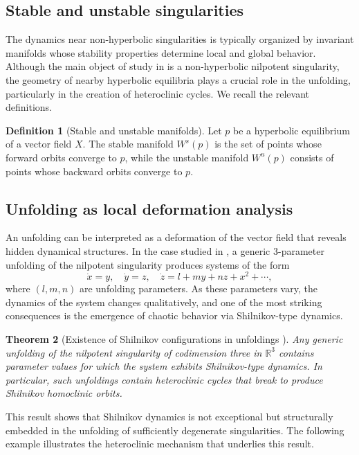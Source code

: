 \documentclass[12pt, a4paper, oneside]{book}
\theoremstyle{plain}
\newtheorem{theorem}{Theorem}[chapter]
\theoremstyle{definition}
\newtheorem{definition}[theorem]{Definition}
\theoremstyle{remark}
\theoremstyle{definition}
\begin{document}
\subsection{Stable and unstable singularities}

The dynamics near non-hyperbolic singularities is typically organized by invariant
manifolds whose stability properties determine local and global behavior. Although the
main object of study in \cite{ibanez2005shil} is a non-hyperbolic nilpotent singularity,
the geometry of nearby hyperbolic equilibria plays a crucial role in the unfolding,
particularly in the creation of heteroclinic cycles. We recall the relevant definitions.

\begin{definition}[Stable and unstable manifolds]
Let $p$ be a hyperbolic equilibrium of a vector field $X$. The stable manifold $W^s(p)$
is the set of points whose forward orbits converge to $p$, while the unstable manifold
$W^u(p)$ consists of points whose backward orbits converge to $p$.
\end{definition}

\subsection{Unfolding as local deformation analysis}

An unfolding can be interpreted as a deformation of the vector field that reveals hidden
dynamical structures. In the case studied in \cite{ibanez2005shil}, a generic 3-parameter
unfolding of the nilpotent singularity produces systems of the form
\[
\dot{x} = y, \quad
\dot{y} = z, \quad
\dot{z} = l + my + nz + x^2 + \cdots,
\]
where $(l,m,n)$ are unfolding parameters. As these parameters vary, the dynamics of the
system changes qualitatively, and one of the most striking consequences is the emergence
of chaotic behavior via Shilnikov-type dynamics.

\begin{theorem}[Existence of Shilnikov configurations in unfoldings \cite{ibanez2005shil}]
Any generic unfolding of the nilpotent singularity of codimension three in $\mathbb{R}^3$
contains parameter values for which the system exhibits Shilnikov-type dynamics. In
particular, such unfoldings contain heteroclinic cycles that break to produce Shilnikov
homoclinic orbits.
\end{theorem}

This result shows that Shilnikov dynamics is not exceptional but structurally embedded in
the unfolding of sufficiently degenerate singularities. The following example illustrates
the heteroclinic mechanism that underlies this result.
\end{document}
